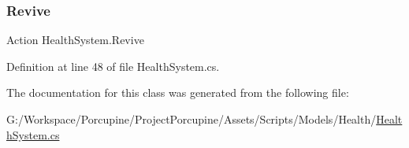\subsubsection{\texorpdfstring{Revive}{Revive}}
{\footnotesize\ttfamily Action Health\+System.\+Revive}



Definition at line 48 of file Health\+System.\+cs.



The documentation for this class was generated from the following file\+:\begin{DoxyCompactItemize}
\item 
G\+:/\+Workspace/\+Porcupine/\+Project\+Porcupine/\+Assets/\+Scripts/\+Models/\+Health/\hyperlink{_health_system_8cs}{Health\+System.\+cs}\end{DoxyCompactItemize}
